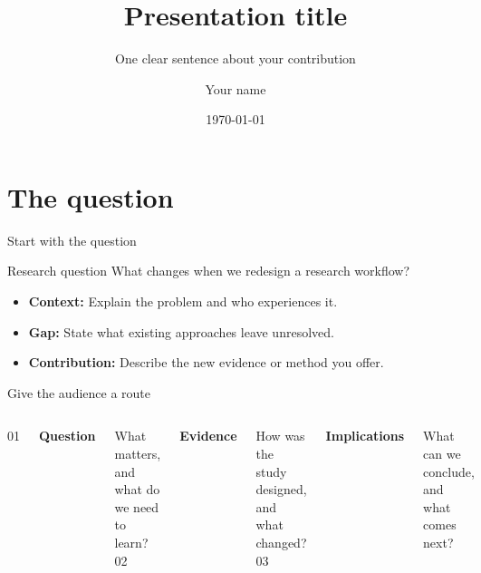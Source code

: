 \documentclass[aspectratio=169,11pt]{beamer}
\title[Presentation title]{Presentation title}
\subtitle{One clear sentence about your contribution}
\author{Your name}
\institute{Your department / Institution}
\date{\today}
\begin{document}
\begin{frame}[plain]
\vspace{8mm}
{\small\color{accent}\insertinstitute}\par
\vspace{7mm}
{\inserttitle\par}
\vspace{4mm}
{\color{accent}\insertsubtitle\par}
\vspace{5mm}
\insertauthor\par
{\small\color{muted}\insertdate}
\end{frame}

\section{The question}
\begin{frame}{Start with the question}
\begin{block}{Research question}
What changes when we redesign a research workflow?
\end{block}
\vspace{4mm}
\begin{itemize}\setlength{\itemsep}{5mm}
\item \textbf{Context:} Explain the problem and who experiences it.
\item \textbf{Gap:} State what existing approaches leave unresolved.
\item \textbf{Contribution:} Describe the new evidence or method you offer.
\end{itemize}
\end{frame}

\begin{frame}{Give the audience a route}
\begin{columns}[T,onlytextwidth]
{\Huge\color{accent}01}\par\vspace{3mm}
\textbf{Question}\par\vspace{2mm}
What matters, and what do we need to learn?
{\Huge\color{accent}02}\par\vspace{3mm}
\textbf{Evidence}\par\vspace{2mm}
How was the study designed, and what changed?
{\Huge\color{accent}03}\par\vspace{3mm}
\textbf{Implications}\par\vspace{2mm}
What can we conclude, and what comes next?
\end{columns}
\end{frame}
\end{document}
